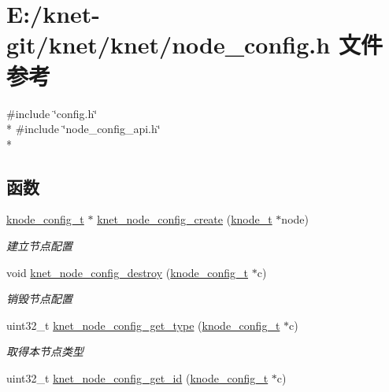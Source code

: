 \hypertarget{a00105}{}\section{E\+:/knet-\/git/knet/knet/node\+\_\+config.h 文件参考}
\label{a00105}
{\ttfamily \#include \char`\"{}config.\+h\char`\"{}}\\*
{\ttfamily \#include \char`\"{}node\+\_\+config\+\_\+api.\+h\char`\"{}}\\*
\subsection*{函数}
\begin{DoxyCompactItemize}
\item 
\hyperlink{a00066_af1cfaee0eb1c76ebf06076b95cc47ee1_af1cfaee0eb1c76ebf06076b95cc47ee1}{knode\+\_\+config\+\_\+t} $\ast$ \hyperlink{a00105_aaec30b9e1634e9e28770dfaa6d96f327_aaec30b9e1634e9e28770dfaa6d96f327}{knet\+\_\+node\+\_\+config\+\_\+create} (\hyperlink{a00066_a5e720b27efbc9ad744240f5f4233763a_a5e720b27efbc9ad744240f5f4233763a}{knode\+\_\+t} $\ast$node)
\begin{DoxyCompactList}\small\item\em 建立节点配置 \end{DoxyCompactList}\item 
void \hyperlink{a00105_a5c440b19b4772a1dbbe699499560863d_a5c440b19b4772a1dbbe699499560863d}{knet\+\_\+node\+\_\+config\+\_\+destroy} (\hyperlink{a00066_af1cfaee0eb1c76ebf06076b95cc47ee1_af1cfaee0eb1c76ebf06076b95cc47ee1}{knode\+\_\+config\+\_\+t} $\ast$c)
\begin{DoxyCompactList}\small\item\em 销毁节点配置 \end{DoxyCompactList}\item 
uint32\+\_\+t \hyperlink{a00105_a17812fb0dfbb4126997925751ce10840_a17812fb0dfbb4126997925751ce10840}{knet\+\_\+node\+\_\+config\+\_\+get\+\_\+type} (\hyperlink{a00066_af1cfaee0eb1c76ebf06076b95cc47ee1_af1cfaee0eb1c76ebf06076b95cc47ee1}{knode\+\_\+config\+\_\+t} $\ast$c)
\begin{DoxyCompactList}\small\item\em 取得本节点类型 \end{DoxyCompactList}\item 
uint32\+\_\+t \hyperlink{a00105_a9bc8e57e8a9cd95de718d89ef5e303ea_a9bc8e57e8a9cd95de718d89ef5e303ea}{knet\+\_\+node\+\_\+config\+\_\+get\+\_\+id} (\hyperlink{a00066_af1cfaee0eb1c76ebf06076b95cc47ee1_af1cfaee0eb1c76ebf06076b95cc47ee1}{knode\+\_\+config\+\_\+t} $\ast$c)

\end{DoxyCompactItemize}

